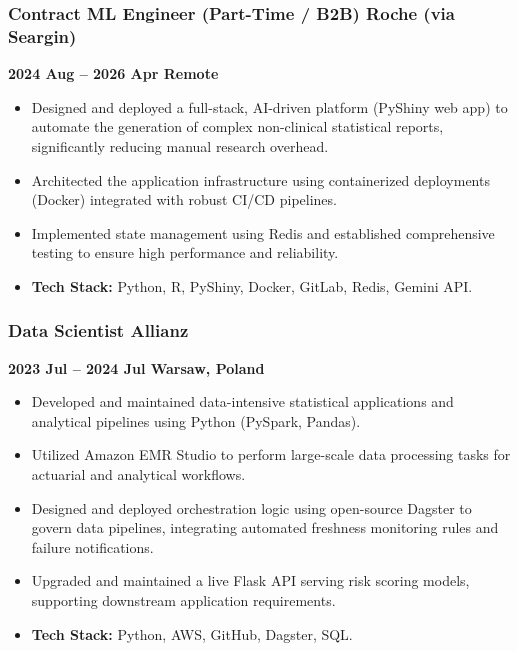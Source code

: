 \documentclass[
  9pt,
  letterpaper,
  DIV=11,
  numbers=noendperiod]{scrartcl}
\providecommand{\tightlist}{%
  \setlength{\itemsep}{0pt}\setlength{\parskip}{0pt}}\usepackage{longtable,booktabs,array}
\begin{document}
\hypertarget{contract-ml-engineer-part-time-b2b-roche-via-seargin}{%
\subsubsection{Contract ML Engineer (Part-Time / B2B) \textbar{} Roche
(via
Seargin)}\label{contract-ml-engineer-part-time-b2b-roche-via-seargin}}

\textbf{2024 Aug -- 2026 Apr \textbar{} Remote}

\begin{itemize}
\tightlist
\item
  Designed and deployed a full-stack, AI-driven platform (PyShiny web
  app) to automate the generation of complex non-clinical statistical
  reports, significantly reducing manual research overhead.
\item
  Architected the application infrastructure using containerized
  deployments (Docker) integrated with robust CI/CD pipelines.
\item
  Implemented state management using Redis and established comprehensive
  testing to ensure high performance and reliability.
\item
  \textbf{Tech Stack:} Python, R, PyShiny, Docker, GitLab, Redis, Gemini
  API.
\end{itemize}

\hypertarget{data-scientist-allianz}{%
\subsubsection{Data Scientist \textbar{}
Allianz}\label{data-scientist-allianz}}

\textbf{2023 Jul -- 2024 Jul \textbar{} Warsaw, Poland}

\begin{itemize}
\tightlist
\item
  Developed and maintained data-intensive statistical applications and
  analytical pipelines using Python (PySpark, Pandas).
\item
  Utilized Amazon EMR Studio to perform large-scale data processing
  tasks for actuarial and analytical workflows.
\item
  Designed and deployed orchestration logic using open-source Dagster to
  govern data pipelines, integrating automated freshness monitoring
  rules and failure notifications.
\item
  Upgraded and maintained a live Flask API serving risk scoring models,
  supporting downstream application requirements.
\item
  \textbf{Tech Stack:} Python, AWS, GitHub, Dagster, SQL.
\end{itemize}
\end{document}

